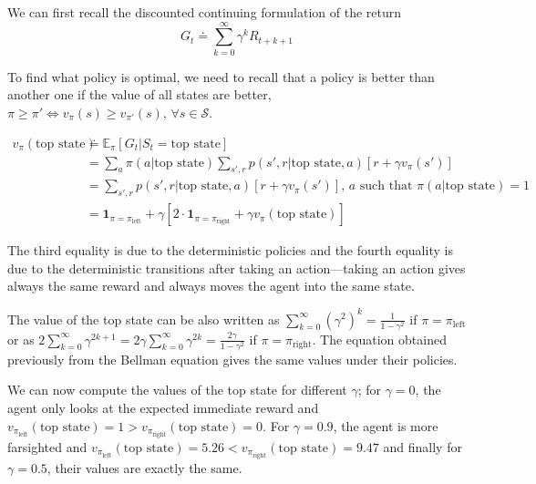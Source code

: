 \documentclass[10pt,a4paper]{article}
\begin{document}
We can first recall the discounted continuing formulation of the return
\begin{equation}
G_t \doteq \sum_{k=0}^\infty \gamma^k R_{t + k + 1}
\end{equation}

To find what policy is optimal, we need to recall that a policy is better than another one if the value of all states are better, $\pi \geq \pi' \iff v_\pi(s) \geq v_{\pi'}(s),\,  \forall s \in \mathcal{S}$.

\begin{equation}
\begin{split}
v_\pi(\textrm{top state}) &\doteq \mathbb{E}_\pi[G_t \lvert S_t=\textrm{top state}] \\
&= \sum_{a} \pi(a \lvert \textrm{top state}) \sum_{s', r} p(s', r \lvert \textrm{top state}, a) [r + \gamma v_\pi(s')]\\
&= \sum_{s', r} p(s', r \lvert \textrm{top state}, a) [r + \gamma v_\pi(s')],\, a \textrm{ such that } \pi(a | \textrm{top state}) = 1\\
&= \textbf{1}_{\pi = \pi_\textrm{left}} + \gamma \left[2 \cdot \textbf{1}_{\pi = \pi_\textrm{right}} + \gamma v_\pi(\textrm{top state})\right]
\end{split}
\end{equation}

The third equality is due to the deterministic policies and the fourth equality is due to the deterministic transitions after taking an action---taking an action gives always the same reward and always moves the agent into the same state.

The value of the top state can be also written as $\sum_{k=0}^\infty (\gamma^2)^k = \frac{1}{1-\gamma^2}$ if $\pi = \pi_\textrm{left}$ or as $2 \sum_{k=0}^\infty \gamma^{2k + 1} = 2 \gamma \sum_{k=0}^\infty \gamma^{2k} = \frac{2 \gamma}{1-\gamma^2}$ if $\pi = \pi_\textrm{right}$. The equation obtained previously from the Bellman equation gives the same values under their policies.

We can now compute the values of the top state for different $\gamma$; for $\gamma=0$, the agent only looks at the expected immediate reward and $v_{\pi_\textrm{left}}(\textrm{top state}) = 1 > v_{\pi_\textrm{right}}(\textrm{top state}) = 0$. For $\gamma=0.9$, the agent is more farsighted and $v_{\pi_\textrm{left}}(\textrm{top state}) = 5.26 < v_{\pi_\textrm{right}}(\textrm{top state}) = 9.47$ and finally for $\gamma=0.5$, their values are exactly the same.
\end{document}
